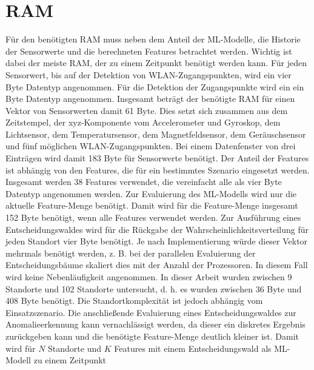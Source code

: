 \newpage
\section{RAM}
Für den benötigten RAM muss neben dem Anteil der ML-Modelle, die Historie der Sensorwerte und die berechneten Features betrachtet werden.
Wichtig ist dabei der meiste RAM, der zu einem Zeitpunkt benötigt werden kann.
\newline
\newline
Für jeden Sensorwert, bis auf der Detektion von WLAN-Zugangspunkten, wird ein vier Byte Datentyp angenommen.
Für die Detektion der Zugangspunkte wird ein ein Byte Datentyp angenommen.
Insgesamt beträgt der benötigte RAM für einen Vektor von Sensorwerten damit 61 Byte.
\newline
\newline
Dies setzt sich zusammen aus dem Zeitstempel, der xyz-Komponente vom Accelerometer und Gyroskop, dem Lichtsensor,
dem Temperatursensor, dem Magnetfeldsensor, dem Geräuschsensor und fünf möglichen WLAN-Zugangspunkten.
Bei einem Datenfenster von drei Einträgen wird damit 183 Byte für Sensorwerte benötigt.
\newline
\newline
Der Anteil der Features ist abhängig von den Features, die für ein bestimmtes Szenario eingesetzt werden.
Insgesamt werden 38 Features verwendet, die vereinfacht alle als vier Byte Datentyp angenommen werden.
Zur Evaluierung des ML-Modells wird nur die aktuelle Feature-Menge benötigt.
Damit wird für die Feature-Menge insgesamt 152 Byte benötigt, wenn alle Features verwendet werden.
\newline
\newline
Zur Ausführung eines Entscheidungswaldes wird für die Rückgabe der Wahrscheinlichkeitsverteilung für jeden Standort vier Byte benötigt.
Je nach Implementierung würde dieser Vektor mehrmals benötigt werden, z. B. bei der parallelen Evaluierung der Entscheidungsbäume skaliert dies mit der Anzahl der Prozessoren.
In diesem Fall wird keine Nebenläufigkeit angenommen.
In dieser Arbeit wurden zwischen 9 Standorte und 102 Standorte untersucht, d. h. es wurden zwischen 36 Byte und 408 Byte benötigt.
Die Standortkomplexität ist jedoch abhängig vom Einsatzszenario.
Die anschließende Evaluierung eines Entscheidungswaldes zur Anomalieerkennung kann vernachlässigt werden,
da dieser ein diskretes Ergebnis zurückgeben kann und die benötigte Feature-Menge deutlich kleiner ist.
Damit wird für $N$ Standorte und $K$ Features mit einem Entscheidungswald als ML-Modell zu einem Zeitpunkt
